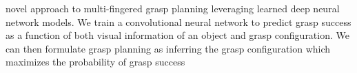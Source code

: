 novel approach to multi-fingered grasp planning leveraging learned deep neural network models. We train a convolutional neural network to predict grasp success as a function of both visual information of an object and grasp configuration. We can then formulate grasp planning as inferring the grasp configuration which maximizes the probability of grasp success~\cite{luplanning}
